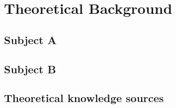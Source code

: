 \chapter{Theoretical Background}
\label{Chapter-Theoretical-Background}

\section{Subject A}
\section{Subject B}

\section{Theoretical knowledge sources}
